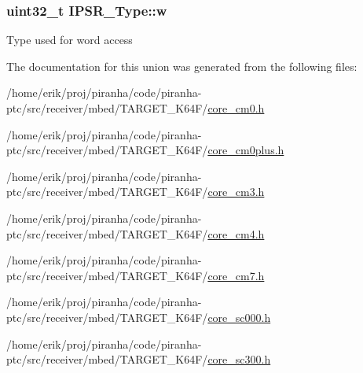 \subsubsection[{\texorpdfstring{w}{w}}]{\setlength{\rightskip}{0pt plus 5cm}uint32\+\_\+t I\+P\+S\+R\+\_\+\+Type\+::w}\hypertarget{unionIPSR__Type_a4adca999d3a0bc1ae682d73ea7cfa879}{}\label{unionIPSR__Type_a4adca999d3a0bc1ae682d73ea7cfa879}
Type used for word access 

The documentation for this union was generated from the following files\+:\begin{DoxyCompactItemize}
\item 
/home/erik/proj/piranha/code/piranha-\/ptc/src/receiver/mbed/\+T\+A\+R\+G\+E\+T\+\_\+\+K64\+F/\hyperlink{core__cm0_8h}{core\+\_\+cm0.\+h}\item 
/home/erik/proj/piranha/code/piranha-\/ptc/src/receiver/mbed/\+T\+A\+R\+G\+E\+T\+\_\+\+K64\+F/\hyperlink{core__cm0plus_8h}{core\+\_\+cm0plus.\+h}\item 
/home/erik/proj/piranha/code/piranha-\/ptc/src/receiver/mbed/\+T\+A\+R\+G\+E\+T\+\_\+\+K64\+F/\hyperlink{core__cm3_8h}{core\+\_\+cm3.\+h}\item 
/home/erik/proj/piranha/code/piranha-\/ptc/src/receiver/mbed/\+T\+A\+R\+G\+E\+T\+\_\+\+K64\+F/\hyperlink{core__cm4_8h}{core\+\_\+cm4.\+h}\item 
/home/erik/proj/piranha/code/piranha-\/ptc/src/receiver/mbed/\+T\+A\+R\+G\+E\+T\+\_\+\+K64\+F/\hyperlink{core__cm7_8h}{core\+\_\+cm7.\+h}\item 
/home/erik/proj/piranha/code/piranha-\/ptc/src/receiver/mbed/\+T\+A\+R\+G\+E\+T\+\_\+\+K64\+F/\hyperlink{core__sc000_8h}{core\+\_\+sc000.\+h}\item 
/home/erik/proj/piranha/code/piranha-\/ptc/src/receiver/mbed/\+T\+A\+R\+G\+E\+T\+\_\+\+K64\+F/\hyperlink{core__sc300_8h}{core\+\_\+sc300.\+h}\end{DoxyCompactItemize}
